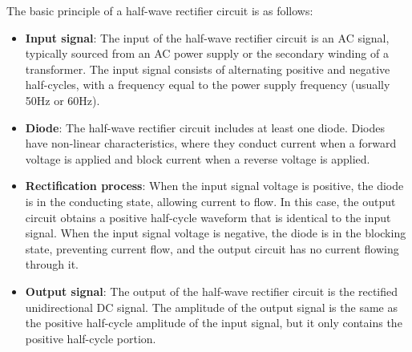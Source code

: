 \documentclass[UTF8]{article}
\begin{document}
   The basic principle of a half-wave rectifier circuit is as follows:
   \begin{itemize}
   \item \textbf{Input signal}: The input of the half-wave rectifier circuit is an AC signal, typically sourced from an AC power supply or the secondary winding of a transformer. The input signal consists of alternating positive and negative half-cycles, with a frequency equal to the power supply frequency (usually 50Hz or 60Hz).
   
   \item \textbf{Diode}: The half-wave rectifier circuit includes at least one diode. Diodes have non-linear characteristics, where they conduct current when a forward voltage is applied and block current when a reverse voltage is applied.
   
   \item \textbf{Rectification process}: When the input signal voltage is positive, the diode is in the conducting state, allowing current to flow. In this case, the output circuit obtains a positive half-cycle waveform that is identical to the input signal. When the input signal voltage is negative, the diode is in the blocking state, preventing current flow, and the output circuit has no current flowing through it.
   
   \item \textbf{Output signal}: The output of the half-wave rectifier circuit is the rectified unidirectional DC signal. The amplitude of the output signal is the same as the positive half-cycle amplitude of the input signal, but it only contains the positive half-cycle portion.
   \end{itemize}
   
\end{document}
